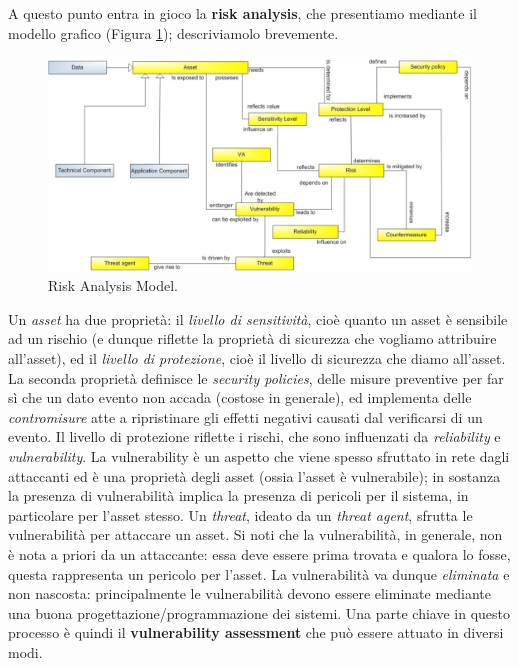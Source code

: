 A questo punto entra in gioco la \textbf{risk analysis}, che presentiamo mediante il modello grafico (Figura \ref{img:risk_analysis_model}); descriviamolo brevemente. 
\begin{figure}[htbp]
	\centering
	\includegraphics[scale = 0.4]{images/risk_analysis_model}
	\caption{Risk Analysis Model.}
	\label{img:risk_analysis_model}
\end{figure}

Un \textit{asset} ha due proprietà: il \textit{livello di sensitività}, cioè quanto un asset è sensibile ad un rischio (e dunque riflette la proprietà di sicurezza che vogliamo attribuire all'asset), ed il \textit{livello di protezione}, cioè il livello di sicurezza che diamo all'asset. La seconda proprietà definisce le \textit{security policies}, delle misure preventive per far sì che un dato evento non accada (costose in generale), ed implementa delle \textit{contromisure} atte a ripristinare gli effetti negativi causati dal verificarsi di un evento. Il livello di protezione riflette i rischi, che sono influenzati da \textit{reliability} e \textit{vulnerability}. La vulnerability è un aspetto che viene spesso sfruttato in rete dagli attaccanti ed è una proprietà degli asset (ossia l'asset è vulnerabile); in sostanza la presenza di vulnerabilità implica la presenza di pericoli per il sistema, in particolare per l'asset stesso. Un \textit{threat}, ideato da un \textit{threat agent}, sfrutta le vulnerabilità per attaccare un asset. Si noti che la vulnerabilità, in generale, non è nota a priori da un attaccante: essa deve essere prima trovata e qualora lo fosse, questa rappresenta un pericolo per l'asset. La vulnerabilità va dunque \textit{eliminata} e non nascosta: principalmente le vulnerabilità devono essere eliminate mediante una buona progettazione/programmazione dei sistemi. Una parte chiave in questo processo è quindi il \textbf{vulnerability assessment} che può essere attuato in diversi modi.

